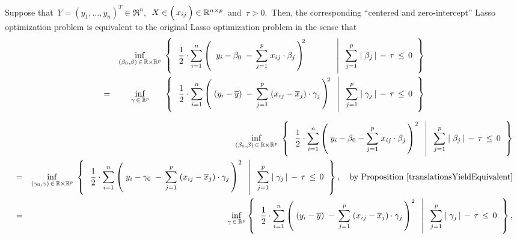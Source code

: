 \vskip 0.5cm
\begin{theorem}
\label{CanCenterAndRemoveIntercept}
\mbox{}
\vskip 0.0cm
\noindent
Suppose that
\,$Y = (y_{1},\ldots,y_{n})^{T} \in \Re^{n}$,\,
\,$X \in \left(\,\overset{{\color{white}-}}{x_{ij}}\,\right)\in\Re^{n \times p}$\, and
\,$\tau > 0$.\,
Then, the corresponding ``centered and zero-intercept'' Lasso optimization problem is equivalent to
the original Lasso optimization problem in the sense that
\begin{eqnarray*}
&&
	\underset{(\beta_{0},\beta)\,\in\,\Re\times\Re^{p}}{\inf}\;
	\left\{\;\;
		\left.
		\dfrac{1}{2}
		\cdot
		\overset{n}{\underset{i=1}{\sum}}
		\left(\;
			{\color{white}.}y_{i} - \beta_{0}{\color{white}.}
			-\,
			\overset{p}{\underset{j=1}{\sum}}\; x_{ij}\cdot\beta_{j}
			\,\right)^{\!\!2}
		{\color{white}..........}
		\;\;\,\right\vert\;\;
		\overset{p}{\underset{j=1}{\sum}}\;
		\vert\;\beta_{j}\,\vert
		\, - \,
		\tau \, \leq \, 0
		\;\;\right\}
\\
& = &
	\underset{{\color{white}......}\gamma\,\in\,\Re^{p}{\color{white}......}}{\inf}\;
	\left\{\;\;
		\left.
		\dfrac{1}{2}
		\cdot
		\overset{n}{\underset{i=1}{\sum}}
		\left(\;
			(y_{i} - \overline{y})
			\;-\,
			\overset{p}{\underset{j=1}{\sum}}\; (x_{ij}-\overline{x}_{j})\cdot\gamma_{j}
			\,\right)^{\!\!2}
		\;\;\,\right\vert\;\;
		\overset{p}{\underset{j=1}{\sum}}\;
		\vert\;\gamma_{j}\,\vert
		\, - \,
		\tau \, \leq \, 0
		\;\;\right\}
\end{eqnarray*}
\end{theorem}
\proof
\begin{eqnarray*}
&&
	\underset{(\beta_{0},\beta)\,\in\,\Re\times\Re^{p}}{\inf}\;
	\left\{\;\;
		\left.
		\dfrac{1}{2}
		\cdot
		\overset{n}{\underset{i=1}{\sum}}
		\left(\; y_{i} - \beta_{0} - \overset{p}{\underset{j=1}{\sum}}\; x_{ij}\cdot\beta_{j}\,\right)^{2}
		\;\;\,\right\vert\;\;
		\overset{p}{\underset{j=1}{\sum}}\;
		\vert\;\beta_{j}\,\vert
		\, - \,
		\tau \, \leq \, 0
		\;\;\right\}
\\
& = &
	\underset{(\gamma_{0},\gamma)\,\in\,\Re\times\Re^{p}}{\inf}\;
	\left\{\;\;
		\left.
		\dfrac{1}{2}
		\cdot
		\overset{n}{\underset{i=1}{\sum}}
		\left(\; y_{i} - \gamma_{0} \;-\, \overset{p}{\underset{j=1}{\sum}}\; (x_{ij}-\overline{x}_{j})\cdot\gamma_{j}\,\right)^{2}
		\;\;\,\right\vert\;\;
		\overset{p}{\underset{j=1}{\sum}}\;
		\vert\;\gamma_{j}\,\vert
		\, - \,
		\tau \, \leq \, 0
		\;\;\right\},
	\quad
	\textnormal{by Proposition \ref{translationsYieldEquivalent}}
\\
& = &
	\underset{\gamma\,\in\,\Re^{p}}{\inf}
	\left\{\;\;
		\left.
		\dfrac{1}{2}
		\cdot
		\overset{n}{\underset{i=1}{\sum}}
		\left(\; (y_{i} - \overline{y}) \;-\, \overset{p}{\underset{j=1}{\sum}}\; (x_{ij}-\overline{x}_{j})\cdot\gamma_{j}\,\right)^{2}
		\;\;\,\right\vert\;\;
		\overset{p}{\underset{j=1}{\sum}}\;
		\vert\;\gamma_{j}\,\vert
		\, - \,
		\tau \, \leq \, 0
		\;\;\right\},
\end{eqnarray*}

